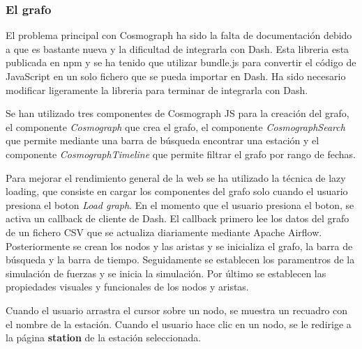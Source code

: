 \subsubsection{El grafo}
El problema principal con Cosmograph ha sido la falta de documentación debido a que es bastante nueva y la dificultad de integrarla con Dash. Esta libreria esta publicada en npm y se ha tenido que utilizar bundle.js para convertir el código de JavaScript en un solo fichero que se pueda importar en Dash. Ha sido necesario modificar ligeramente la libreria para terminar de integrarla con Dash.

Se han utilizado tres componentes de Cosmograph JS para la creación del grafo, el componente \textit{Cosmograph} que crea el grafo, el componente \textit{CosmographSearch} que permite mediante una barra de búsqueda encontrar una estación y el componente \textit{CosmographTimeline} que permite filtrar el grafo por rango de fechas.

Para mejorar el rendimiento general de la web se ha utilizado la técnica de lazy loading, que consiste en cargar los componentes del grafo solo cuando el usuario presiona el boton \textit{Load graph}. En el momento que el usuario presiona el boton, se activa un callback de cliente de Dash. El callback primero lee los datos del grafo de un fichero CSV que se actualiza diariamente mediante Apache Airflow. Posteriormente se crean los nodos y las aristas y se inicializa el grafo, la barra de búsqueda y la barra de tiempo. Seguidamente se establecen los paramentros de la simulación de fuerzas y se inicia la simulación. Por último se establecen las propiedades visuales y funcionales de los nodos y aristas.

Cuando el usuario arrastra el cursor sobre un nodo, se muestra un recuadro con el nombre de la estación. Cuando el usuario hace clic en un nodo, se le redirige a la página \textbf{station} de la estación seleccionada.